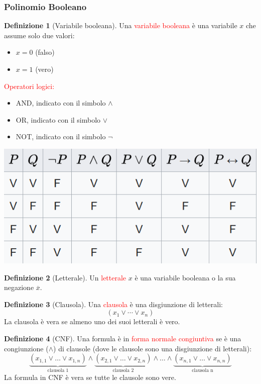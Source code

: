 \documentclass{article}  %
\theoremstyle{definition}
\newtheorem{definition}{Definizione}[section]
\begin{document}
\subsubsection{Polinomio Booleano}
\begin{definition}[Variabile booleana] Una \textcolor{red}{variabile booleana} è una variabile $x$ che assume solo due valori:
	\begin{itemize}
		\item $x=0$ (falso)
		\item $x=1$ (vero)
	\end{itemize}
\end{definition}
\textcolor{red}{Operatori logici:}
\begin{itemize}
	\item AND, indicato con il simbolo $\land$
	\item OR, indicato con il simbolo $\lor$
	\item NOT, indicato con il simbolo $\lnot$
\end{itemize}
\begin{center}
	\includegraphics[width=0.6\linewidth]{boolean-exp.png}
\end{center}
\begin{definition}[Letterale]
	Un \textcolor{red}{letterale} $x$ è una variabile booleana o la sua negazione $\overline{x}$.
\end{definition}
\begin{definition}[Clausola]
	Una \textcolor{red}{clausola} è una disgiunzione di letterali:
	\[
		(x_1 \lor \cdots \lor x_n)
	\]
	La clausola è vera se almeno uno dei suoi letterali è vero.
\end{definition}
\begin{definition}[CNF]
	Una formula è in \textcolor{red}{forma normale congiuntiva} se è una congiunzione ($\land$) di clausole (dove le clausole sono una disgiunzione di letterali):
	\[
		\underbrace{(x_{1,1} \lor \dots \lor x_{1,n})}_{\text{clausola 1}}
		\land
		\underbrace{(x_{2,1} \lor \dots \lor x_{2,n})}_{\text{clausola 2}}
		\land \dots \land
		\underbrace{(x_{n,1} \lor \dots \lor x_{n,n})}_{\text{clausola n}}
	\]
	La formula in CNF è vera se tutte le clausole sono vere.
\end{definition}
\end{document}

